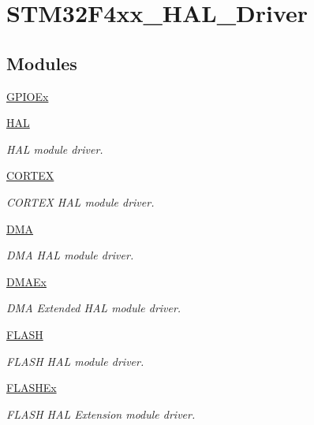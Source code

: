 \hypertarget{group___s_t_m32_f4xx___h_a_l___driver}{}\section{S\+T\+M32\+F4xx\+\_\+\+H\+A\+L\+\_\+\+Driver}
\label{group___s_t_m32_f4xx___h_a_l___driver}
\subsection*{Modules}
\begin{DoxyCompactItemize}
\item 
\mbox{\hyperlink{group___g_p_i_o_ex}{G\+P\+I\+O\+Ex}}
\item 
\mbox{\hyperlink{group___h_a_l}{H\+AL}}
\begin{DoxyCompactList}\small\item\em H\+AL module driver. \end{DoxyCompactList}\item 
\mbox{\hyperlink{group___c_o_r_t_e_x}{C\+O\+R\+T\+EX}}
\begin{DoxyCompactList}\small\item\em C\+O\+R\+T\+EX H\+AL module driver. \end{DoxyCompactList}\item 
\mbox{\hyperlink{group___d_m_a}{D\+MA}}
\begin{DoxyCompactList}\small\item\em D\+MA H\+AL module driver. \end{DoxyCompactList}\item 
\mbox{\hyperlink{group___d_m_a_ex}{D\+M\+A\+Ex}}
\begin{DoxyCompactList}\small\item\em D\+MA Extended H\+AL module driver. \end{DoxyCompactList}\item 
\mbox{\hyperlink{group___f_l_a_s_h}{F\+L\+A\+SH}}
\begin{DoxyCompactList}\small\item\em F\+L\+A\+SH H\+AL module driver. \end{DoxyCompactList}\item 
\mbox{\hyperlink{group___f_l_a_s_h_ex}{F\+L\+A\+S\+H\+Ex}}
\begin{DoxyCompactList}\small\item\em F\+L\+A\+SH H\+AL Extension module driver. \end{DoxyCompactList}\item 

\end{DoxyCompactItemize}
